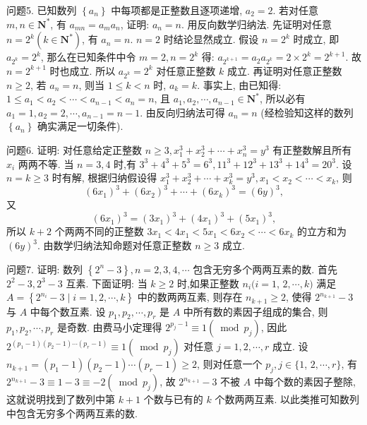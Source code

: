 问题5. 已知数列 $\left\{a_n\right\}$ 中每项都是正整数且逐项递增, $a_2=2$. 若对任意 $m, n \in\mathbf{N}^*$, 有 $a_{m n}=a_m a_n$, 证明: $a_n=n$.
用反向数学归纳法.
先证明对任意 $n=2^k\left(k \in \mathbf{N}^*\right)$, 有 $a_n=n$.
$n=2$ 时结论显然成立.
假设 $n=2^k$ 时成立, 即 $a_{2^k}=2^k$, 那么在已知条件中令 $m=2, n=2^k$ 得: $a_{2^{k+1}}=a_2 a_{2^k}=2 \times 2^k=2^{k+1}$. 故 $n=2^{k+1}$ 时也成立.
所以 $a_{2^k}=2^k$ 对任意正整数 $k$ 成立.
再证明对任意正整数 $n \geqslant 2$, 若 $a_n=n$, 则当 $1 \leqslant k<n$ 时, $a_k=k$.
事实上, 由已知得: $1 \leqslant a_1<a_2<\cdots<a_{n-1}<a_n=n$, 且 $a_1, a_2, \cdots, a_{n-1} \in \mathbf{N}^*$, 所以必有 $a_1=1, a_2=2, \cdots, a_{n-1}=n-1$.
由反向归纳法可得 $a_n=n$ (经检验知这样的数列 $\left\{a_n\right\}$ 确实满足一切条件).



问题6. 证明: 对任意给定正整数 $n \geqslant 3, x_1^3+x_2^3+\cdots+x_n^3=y^3$ 有正整数解且所有 $x_i$ 两两不等.
当 $n=3,4$ 时,有 $3^3+4^3+5^3=6^3, 11^3+12^3+13^3+14^3=20^3$. 设 $n=k \geqslant 3$ 时有解, 根据归纳假设得 $x_1^3+x_2^3+\cdots+x_k^3=y^3, x_1<x_2<\cdots< x_k$, 则
$$
\left(6 x_1\right)^3+\left(6 x_2\right)^3+\cdots+\left(6 x_k\right)^3=(6 y)^3,
$$
又
$$
\left(6 x_1\right)^3=\left(3 x_1\right)^3+\left(4 x_1\right)^3+\left(5 x_1\right)^3,
$$
所以 $k+2$ 个两两不同的正整数 $3 x_1<4 x_1<5 x_1<6 x_2<\cdots<6 x_k$ 的立方和为 $(6 y)^3$.
由数学归纳法知命题对任意正整数 $n \geqslant 3$ 成立.



问题7. 证明: 数列 $\left\{2^n-3\right\}, n=2,3,4, \cdots$ 包含无穷多个两两互素的数.
首先 $2^2-3,2^3-3$ 互素.
下面证明: 当 $k \geqslant 2$ 时,如果正整数 $n_i(i=1$, $2, \cdots, k)$ 满足 $A=\left\{2^{n_i}-3 \mid i=1,2, \cdots, k\right\}$ 中的数两两互素, 则存在 $n_{k+1} \geqslant 2$, 使得 $2^{n_{k+1}}-3$ 与 $A$ 中每个数互素.
设 $p_1, p_2, \cdots, p_r$ 是 $A$ 中所有数的素因子组成的集合, 则 $p_1, p_2, \cdots, p_r$ 是奇数.
由费马小定理得 $2^{p_j-1} \equiv 1\left(\bmod p_j\right)$, 因此 $2^{\left(p_1-1\right)\left(p_2-1\right) \cdots\left(p_r-1\right)} \equiv 1\left(\bmod p_j\right)$ 对任意 $j=1,2, \cdots, r$ 成立.
设 $n_{k+1}=\left(p_1-1\right)\left(p_2-1\right) \cdots\left(p_r-1\right) \geqslant 2$, 则对任意一个 $p_j, j \in\{1$, $2, \cdots, r\}$, 有 $2^{n_{k+1}}-3 \equiv 1-3 \equiv-2\left(\bmod p_j\right)$, 故 $2^{n_{k+1}}-3$ 不被 $A$ 中每个数的素因子整除, 这就说明找到了数列中第 $k+1$ 个数与已有的 $k$ 个数两两互素.
以此类推可知数列中包含无穷多个两两互素的数.



